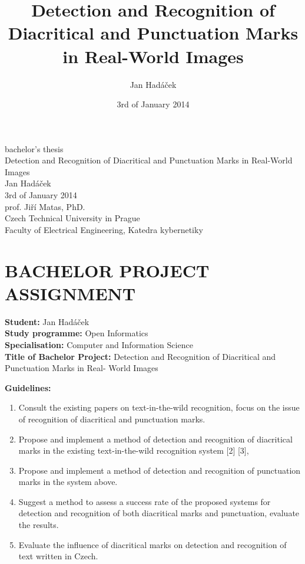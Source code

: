 \documentclass[12pt,a4paper]{report}
\title{Detection and Recognition of Diacritical and Punctuation Marks in Real-World Images}
\author{Jan Hadáček}
\date{3rd of January 2014}
\begin{document}
\begin{titlepage}
    \centering
    \large
    bachelor's thesis \\[2cm]
    \Huge Detection and Recognition of Diacritical and Punctuation Marks in Real-World Images \\[1cm]
    \large Jan Hadáček \\[2cm]
    3rd of January 2014 \\[1cm]
    prof. Jiří Matas, PhD. \\[1cm]
    Czech Technical University in Prague \\ Faculty of Electrical Engineering, Katedra kybernetiky
\end{titlepage}

\clearpage
\thispagestyle{empty}
\mbox{}
\clearpage

\chapter*{BACHELOR PROJECT ASSIGNMENT}
\begin{flushright}
    \textbf{Student:} Jan Hadáček \\
    \textbf{Study programme:} Open Informatics \\
    \textbf{Specialisation:} Computer and Information Science \\
    \textbf{Title of Bachelor Project:} Detection and Recognition of Diacritical and Punctuation Marks in Real- World Images
\end{flushright}

\textbf{Guidelines:}
\begin{enumerate}
    \item Consult the existing papers on text-in-the-wild recognition, focus on the issue of recognition of diacritical and punctuation marks.
    \item Propose and implement a method of detection and recognition of diacritical marks in the existing text-in-the-wild recognition system [2] [3],
    \item Propose and implement a method of detection and recognition of punctuation marks in the system above.
    \item Suggest a method to assess a success rate of the proposed systems for detection and recognition of both diacritical marks and punctuation, evaluate the results.
    \item Evaluate the influence of diacritical marks on detection and recognition of text written in Czech.
\end{enumerate}
\end{document}
